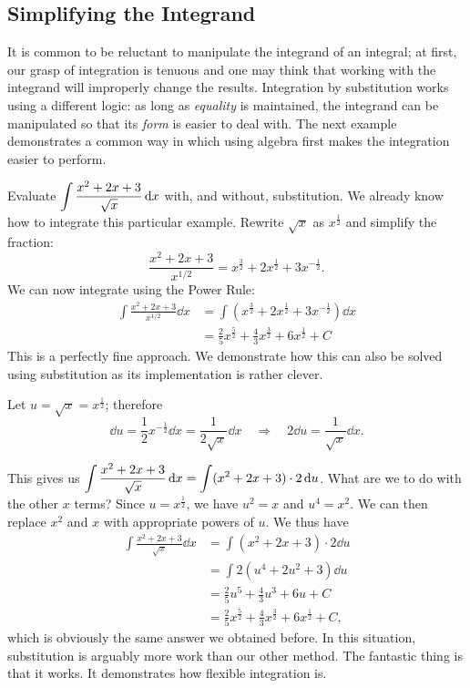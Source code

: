 \subsection{Simplifying the Integrand}

It is common to be reluctant to manipulate the integrand of an integral; at first, our grasp of integration is tenuous and one may think that working with the integrand will improperly change the results. Integration by substitution works using a different logic: as long as \emph{equality} is maintained, the integrand can be manipulated so that its \emph{form} is easier to deal with. The next example demonstrates a common way in which using algebra first makes the integration easier to perform.

\begin{example}\label{ex_sub11}%
Evaluate $\displaystyle\int \frac{x^2+2x+3}{\sqrt{x}}\operatorname{d}\! x$ with, and without, substitution.
\solution
We already know how to integrate this particular example. Rewrite $\sqrt{x}$ as $x^\frac12$ and simplify the fraction:
	\[ \frac{x^2+2x+3}{x^{1/2}} = x^\frac32 + 2x^\frac12 + 3x^{-\frac12}.\]
We can now integrate using the Power Rule:
\begin{align*}
	\int \frac{x^2+2x+3}{x^{1/2}}\dd x &= \int\left(x^\frac32 + 2x^\frac12 + 3x^{-\frac12}\right)\dd x\\
	&=	\frac25x^\frac52 + \frac43x^\frac32 + 6x^\frac12 + C
\end{align*}
This is a perfectly fine approach. We demonstrate how this can also be solved using substitution as its implementation is rather clever.

Let $u = \sqrt{x} = x^\frac12$; therefore 
\[\dd u = \frac12x^{-\frac12}\dd x = \frac{1}{2\sqrt{x}}\dd x \quad \Rightarrow \quad 2\dd u = \frac{1}{\sqrt{x}}\dd x.\]
		
This gives us $\displaystyle \int \frac{x^2+2x+3}{\sqrt{x}}\operatorname{d}\! x = \int (x^2+2x+3)\cdot2\operatorname{d}\! u$. What are we to do with the other $x$ terms? Since $u=x^{\frac12}$, we have $u^2=x$ and $u^4=x^2$. We can then replace $x^2$ and $x$ with appropriate powers of $u$. We thus have
\begin{align*}
	\int \frac{x^2+2x+3}{\sqrt{x}}\dd x
	&= \int (x^2+2x+3)\cdot2\dd u\\
	&= \int 2(u^4 + 2u^2 + 3)\dd u \\
	&= \frac25u^5 + \frac43u^3 + 6u + C \\
	&= \frac25x^\frac52 + \frac43x^\frac32 + 6x^\frac12+C,
\end{align*}
which is obviously the same answer we obtained before. In this situation, substitution is arguably more work than our other method. The fantastic thing is that it works. It demonstrates how flexible integration is.
\end{example}



